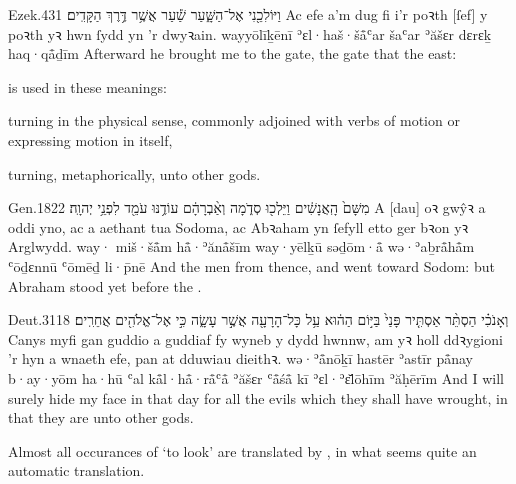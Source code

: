 \begin{example}{Ezek.}{43}{1}{}{}
	\quoling
	{וַיּוֹלִכֵ֖נִי אֶל־הַשָּׁ֑עַר שַׁ֕עַר אֲשֶׁ֥ר  דֶּ֥רֶךְ הַקָּדִֽים׃}
	{Ac efe a’m dug fi i’r poꝛth [ſef] y poꝛth yꝛ hwn ſydd yn   ’r dwyꝛain.}
	{wayyōlīḵēnī ʾɛl·haš·šå̄ʿar šaʿar ʾăšɛr  dɛrɛḵ haq·qå̄ḏīm}
	{Afterward he brought me to the gate,  the gate that   the east:}
\end{example}

\begin{paper}
	 is used in these meanings:
	\begin{compactitem}
		\item turning in the physical sense, commonly adjoined with verbs of motion or expressing motion in itself,
		\item turning, metaphorically, unto other gods.
	\end{compactitem}
\end{paper}

\begin{example}{Gen.}{18}{22}{}{}
	\quoling
	{ מִשָּׁם֙ הָֽאֲנָשִׁ֔ים וַיֵּלְכ֖וּ סְדֹ֑מָה וְאַ֨בְרָהָ֔ם עוֹדֶ֥נּוּ עֹמֵ֖ד לִפְנֵ֥י יְהוָֽה׃}
	{A [dau] oꝛ gwŷꝛ a  oddi yno, ac a aethant tua Sodoma, ac Abꝛaham yn ſefyll  etto ger bꝛon yꝛ Arglwydd.}
	{way· miš·šå̄m hå̄·ʾănå̄šīm way·yēlḵū səḏōm·å̄ wə·ʾaḇrå̄hå̄m ʿōḏɛnnū ʿōmēḏ li·p̄nē {\YHWH}}
	{And the men  from thence, and went toward Sodom: but Abraham stood yet before the {\LORD}.}
\end{example}

\begin{example}{Deut.}{31}{18}{}{}
	\quoling
	{וְאָנֹכִ֗י הַסְתֵּ֨ר אַסְתִּ֤יר פָּנַי֙ בַּיּ֣וֹם הַה֔וּא עַ֥ל כָּל־הָרָעָ֖ה אֲשֶׁ֣ר עָשָׂ֑ה כִּ֣י  אֶל־אֱלֹהִ֖ים אֲחֵרִֽים׃}
	{Canys myfi gan guddio a guddiaf fy wyneb y dydd hwnnw, am yꝛ holl ddꝛygioni ’r hyn a wnaeth efe, pan  at dduwiau dieithꝛ.}
	{wə·ʾå̄nōḵī hastēr ʾastīr på̄nay b·ay·yōm ha·hū ʿal kå̄l·hå̄·rå̄ʿå̄ ʾăšɛr ʿå̄śå̄ kī  ʾɛl·ʾɛ̆lōhīm ʾăḥērīm}
	{And I will surely hide my face in that day for all the evils which they shall have wrought, in that they are  unto other gods.}
\end{example}




Almost all occurances of  ‘to look’ are translated by , in what seems quite an automatic translation.

